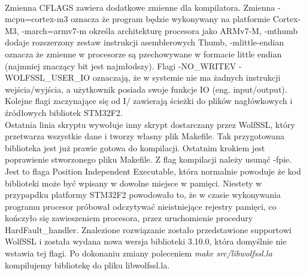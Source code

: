 \documentclass[oneside]{mgr}
\begin{document}
\\Zmienna CFLAGS zawiera dodatkowe zmienne dla kompilatora. Zmienna -mcpu=cortex-m3 oznacza że program będzie wykonywany na platformie Cortex-M3, -march=armv7-m określa architekturę procesora jako ARMv7-M, -mthumb dodaje rozszerzony zestaw instrukcji asemblerowych Thumb, -mlittle-endian oznacza że zmienne w procesorze są pzechowywane w formacie little endian (najmniej znaczący bit jest najmłodszy). Flagi -NO\_WRITEV -WOLFSSL\_USER\_IO oznaczają, że w systemie nie ma żadnych instrukcji wejścia/wyjścia, a użytkownik posiada swoje funkcje IO (eng. input/output). Kolejne flagi zaczynające się od I/ zawierają ścieżki do plików nagłówkowych i źródłowych bibliotek STM32F2.
\\Ostatnia linia skryptu wywołuje inny skrypt dostarczany przez WolfSSL, który przetwarza wszystkie dane i tworzy własny plik Makefile.
Tak przygotowana biblioteka jest już prawie gotowa do kompilacji. Ostatnim krokiem jest poprawienie stworzonego pliku Makefile. Z flag kompilacji należy usunąć -fpie. Jest to flaga Position Independent Executable, która normalnie powoduje że kod biblioteki może być wpisany w dowolne miejsce w pamięci. Niestety w przypapdku platformy STM32F2 powodowało to, że w czasie wykonywania programu procesor próbował odczytywać nieistniejące rejestry pamięci, co kończyło się zawieszeniem procesora, przez uruchomienie procedury HardFault\_handler. Znalezione rozwiązanie zostało przedstawione supportowi WolfSSL i została wydana nowa wersja biblioteki 3.10.0, która domyślnie nie wstawia tej flagi. Po dokonaniu zmiany poleceniem \textit{make src/libwolfssl.la} kompilujemy bibliotekę do pliku libwolfssl.la. 
\end{document}
